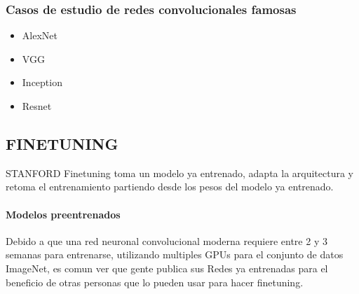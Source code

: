 \documentclass[a4paper,10pt]{article}
\begin{document}
    \subsubsection {Casos de estudio de redes convolucionales famosas}
      \begin{itemize}
	\item AlexNet
	\item VGG
	\item Inception
	\item Resnet
      \end{itemize}

    \subsection {FINETUNING}
    STANFORD
      Finetuning toma un modelo ya entrenado, adapta la arquitectura y retoma el entrenamiento partiendo desde los pesos del modelo ya entrenado.
      \paragraph{Modelos preentrenados}
	Debido a que una red neuronal convolucional moderna requiere entre 2 y 3 semanas para entrenarse, utilizando multiples GPUs para el conjunto de datos ImageNet, es comun ver que gente
	publica sus Redes ya entrenadas para el beneficio de otras personas que lo pueden usar para hacer finetuning.
\end{document}
